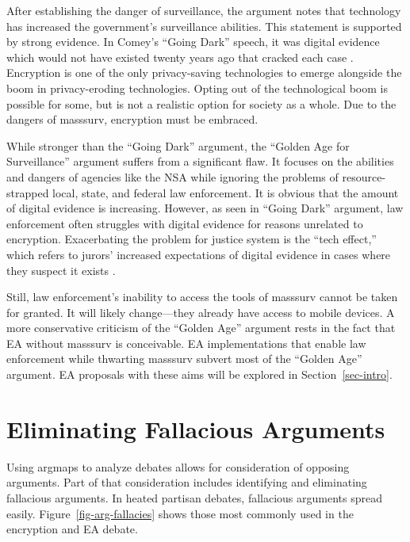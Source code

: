 \documentclass[conference]{IEEEtran}
\newcommand{\myfig}[1]{Figure~\ref{#1}}
\newcommand{\mysec}[1]{Section~\ref{#1}}
\begin{document}
After establishing the danger of surveillance, the argument notes that technology has increased the government's
surveillance abilities. This statement is supported by strong evidence. In Comey's ``Going Dark'' speech, it was digital
evidence which would not have existed twenty years ago that cracked each case \cite{comey_2014}. Encryption is one of
the only privacy-saving technologies to emerge alongside the boom in privacy-eroding technologies. Opting out of the
technological boom is possible for some, but is not a realistic option for society as a whole. Due to the dangers of
\ac{masssurv}, \ac{encryption} must be embraced.

While stronger than the ``Going Dark'' argument, the ``Golden Age for Surveillance'' argument suffers from a significant
flaw. It focuses on the abilities and dangers of agencies like the \ac{NSA} while ignoring the problems of
resource-strapped local, state, and federal law enforcement. It is obvious that the amount of digital evidence is
increasing. However, as seen in ``Going Dark'' argument, law enforcement often struggles with digital evidence for
reasons unrelated to encryption. Exacerbating the problem for justice system is the ``tech effect,'' which refers to
jurors' increased expectations of digital evidence in cases where they suspect it exists \cite{shelton_study_2006}.

Still, law enforcement's inability to access the tools of \ac{masssurv} cannot be taken for granted. It will likely
change---they already have access to mobile devices. A more conservative criticism of the ``Golden Age'' argument rests
in the fact that \ac{EA} without \ac{masssurv} is conceivable. \ac{EA} implementations that enable law enforcement while
thwarting \ac{masssurv} subvert most of the ``Golden Age'' argument. \ac{EA} proposals with these aims will be explored
in \mysec{sec-intro}.



\section{Eliminating Fallacious Arguments}

Using \acp{argmap} to analyze debates allows for consideration of opposing arguments. Part of that consideration
includes identifying and eliminating fallacious arguments. In heated partisan debates, fallacious arguments spread
easily. \myfig{fig-arg-fallacies} shows those most commonly used in the encryption and \ac{EA} debate.
\end{document}
